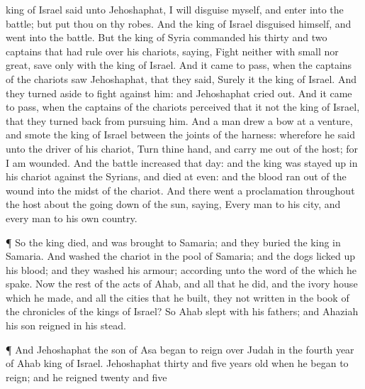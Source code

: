 {king of
Israel
said unto
Jehoshaphat, I will
disguise myself, and
enter into the
battle; but put thou
on thy
robes. And the
king of
Israel
disguised himself, and
went into the
battle.
But the
king of
Syria
commanded his
thirty and
two
captains that had rule over his
chariots,
saying,
Fight neither with
small nor
great, save only with the
king of
Israel.
And it came to pass, when the
captains of the
chariots
saw
Jehoshaphat, that they
said, Surely it
{} the
king of
Israel. And they turned
aside to
fight against him: and
Jehoshaphat cried
out.
And it came to pass, when the
captains of the
chariots
perceived that it
{} not the
king of
Israel, that they turned
back from
pursuing him.
And a
{}
man
drew a
bow at a
venture, and
smote the
king of
Israel between the
joints of the
harness: wherefore he
said unto the driver of his
chariot,
Turn thine
hand, and carry me
out of the
host; for I am
wounded.
And the
battle
increased that
day: and the
king was stayed
up in his
chariot
against the
Syrians, and
died at
even: and the
blood ran
out of the
wound into the
midst of the
chariot.
And there
went a
proclamation throughout the
host about the going
down of the
sun,
saying, Every
man to his
city, and every
man to his own
country.
\par }{\PP {}¶ So the
king
died, and was
brought to
Samaria; and they
buried the
king in
Samaria.
And
{}
washed the
chariot in the
pool of
Samaria; and the
dogs licked
up his
blood; and they
washed his
armour; according unto the
word of the
{} which he
spake.
Now the
rest of the
acts of
Ahab, and all that he
did, and the
ivory
house which he
made, and all the
cities that he
built,
{} they not
written in the
book of the
chronicles of the
kings of
Israel?
So
Ahab
slept with his
fathers; and
Ahaziah his
son
reigned in his stead.
\par }{\PP {}¶ And
Jehoshaphat the
son of
Asa began to
reign over
Judah in the
fourth
year of
Ahab
king of
Israel.
Jehoshaphat
{}
thirty and
five
years
old when he began to
reign; and he
reigned
twenty and
five
}
